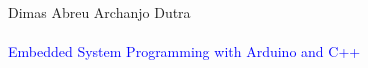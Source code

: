
\begin{titlingpage}
  \begingroup
  \raggedleft
  \vspace*{\baselineskip}
  {\Large Dimas Abreu Archanjo Dutra}\\[0.167\textheight]
  {\bfseries ~}\\[\baselineskip]
  {\textcolor{Blue}{\Huge Embedded System Programming with Arduino and C++}}\\[\baselineskip]
  {\small ~}\par
  \vfill
  \endgroup
\end{titlingpage}

